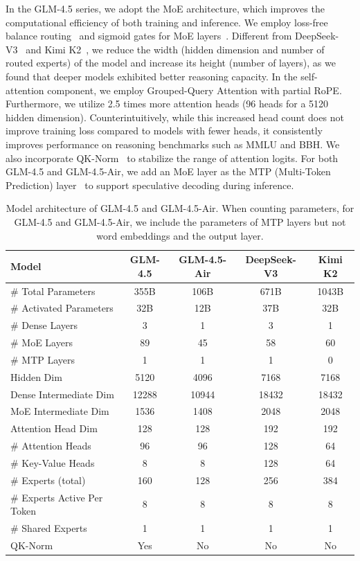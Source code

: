 \documentclass{article}
\theoremstyle{definition}
\begin{document}
In the GLM-4.5 series, we adopt the MoE architecture, which improves the computational efficiency of both training and inference. We employ loss-free balance routing~\cite{wang2024auxiliary} and sigmoid gates for MoE layers~\cite{liu2024deepseek}. Different from DeepSeek-V3~\cite{liu2024deepseek} and Kimi K2~\cite{team2025kimi}, we reduce the width (hidden dimension and number of routed experts) of the model and increase its height (number of layers), as we found that deeper models exhibited better reasoning capacity. In the self-attention component, we employ Grouped-Query Attention with partial RoPE. Furthermore, we utilize 2.5 times more attention heads (96 heads for a 5120 hidden dimension). Counterintuitively, while this increased head count does not improve training loss compared to models with fewer heads, it consistently improves performance on reasoning benchmarks such as MMLU and BBH. We also incorporate QK-Norm~\cite{henry2020querykeynormalizationtransformers} to stabilize the range of attention logits. For both GLM-4.5 and GLM-4.5-Air, we add an MoE layer as the MTP (Multi-Token Prediction) layer~\cite{gloeckle2024mtp} to support speculative decoding during inference.

\begin{table}[!h]
    \centering
    \caption{Model architecture of GLM-4.5 and GLM-4.5-Air. When counting parameters, for GLM-4.5 and GLM-4.5-Air, we include the parameters of MTP layers but not word embeddings and the output layer.}
    
    \label{tab:placeholder}
    \begin{tabular}{l|cc|cc}
    \toprule
       Model & \textbf{GLM-4.5} & \textbf{GLM-4.5-Air} & \textbf{DeepSeek-V3} & \textbf{Kimi K2} \\
    \midrule
       \# Total Parameters & 355B & 106B & 671B & 1043B \\
       \# Activated Parameters & 32B & 12B & 37B & 32B \\
       \# Dense Layers  & 3 & 1 & 3 & 1 \\
       \# MoE Layers & 89 & 45 & 58 & 60 \\
       \# MTP Layers & 1 & 1 & 1 & 0 \\
       Hidden Dim & 5120 & 4096 & 7168 & 7168 \\
       Dense Intermediate Dim & 12288 & 10944 & 18432 & 18432 \\
       MoE Intermediate Dim & 1536 & 1408 & 2048 & 2048 \\
       Attention Head Dim & 128 & 128 & 192 & 192\\
       \# Attention Heads & 96 & 96 & 128 & 64 \\
       \# Key-Value Heads & 8 & 8 & 128 & 64 \\
       \# Experts (total) & 160 & 128 & 256 & 384 \\
       \# Experts Active Per Token & 8 & 8 & 8 & 8\\
       \# Shared Experts & 1 & 1 & 1 & 1\\
       QK-Norm & Yes & No & No & No \\
    \bottomrule
    \end{tabular}
\end{table}
\end{document}
